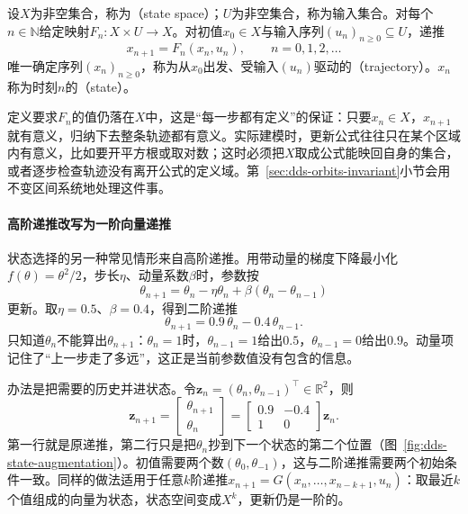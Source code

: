 \begin{definition}[离散时间状态模型]
\label{def:dds-state-model}
设$X$为非空集合，称为（state space）；$U$为非空集合，称为输入集合。对每个$n\in\mathbb N$给定映射$F_n:X\times U\to X$。对初值$x_0\in X$与输入序列$(u_n)_{n\geq0}\subseteq U$，递推
\begin{equation}
  x_{n+1}=F_n(x_n,u_n),\qquad n=0,1,2,\ldots
  \label{eq:dds-state-model}
\end{equation}
唯一确定序列$(x_n)_{n\geq0}$，称为从$x_0$出发、受输入$(u_n)$驱动的（trajectory）。$x_n$称为时刻$n$的（state）。
\end{definition}

定义要求$F_n$的值仍落在$X$中，这是“每一步都有定义”的保证：只要$x_n\in X$，$x_{n+1}$就有意义，归纳下去整条轨迹都有意义。实际建模时，更新公式往往只在某个区域内有意义，比如要开平方根或取对数；这时必须把$X$取成公式能映回自身的集合，或者逐步检查轨迹没有离开公式的定义域。第~\ref{sec:dds-orbits-invariant}小节会用不变区间系统地处理这件事。

\paragraph{高阶递推改写为一阶向量递推}
状态选择的另一种常见情形来自高阶递推。用带动量的梯度下降最小化$f(\theta)=\theta^2/2$，步长$\eta$、动量系数$\beta$时，参数按
\[
  \theta_{n+1}=\theta_n-\eta\theta_n+\beta(\theta_n-\theta_{n-1})
\]
更新。取$\eta=0.5$、$\beta=0.4$，得到二阶递推
\begin{equation}
  \theta_{n+1}=0.9\,\theta_n-0.4\,\theta_{n-1}.
  \label{eq:dds-heavy-ball}
\end{equation}
只知道$\theta_n$不能算出$\theta_{n+1}$：$\theta_n=1$时，$\theta_{n-1}=1$给出$0.5$，$\theta_{n-1}=0$给出$0.9$。动量项记住了“上一步走了多远”，这正是当前参数值没有包含的信息。

办法是把需要的历史并进状态。令$\bm z_n=(\theta_n,\theta_{n-1})^{\top}\in\mathbb R^2$，则
\begin{equation}
  \bm z_{n+1}=\begin{bmatrix}\theta_{n+1}\\ \theta_n\end{bmatrix}
  =\begin{bmatrix}0.9&-0.4\\1&0\end{bmatrix}\bm z_n .
  \label{eq:dds-heavy-ball-state}
\end{equation}
第一行就是原递推，第二行只是把$\theta_n$抄到下一个状态的第二个位置（图~\ref{fig:dds-state-augmentation}）。初值需要两个数$(\theta_0,\theta_{-1})$，这与二阶递推需要两个初始条件一致。同样的做法适用于任意$k$阶递推$x_{n+1}=G(x_n,\ldots,x_{n-k+1},u_n)$：取最近$k$个值组成的向量为状态，状态空间变成$X^k$，更新仍是一阶的。

